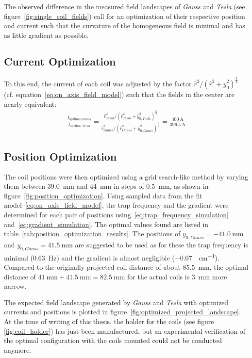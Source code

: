 The observed difference in the measured field landscapes of \textit{Gauss} and \textit{Tesla} (see figure~\ref{fig:single_coil_fields}) call for an optimization of their respective position and current such that the curvature of the homogeneous field is minimal and has as little gradient as possible.

\subsection*{Current Optimization}
To this end, the current of each coil was adjusted by the factor ${\hat r^2}/{(\hat r^2 + \hat y_0^2)^\frac{3}{2}}$ (cf. equation~\ref{eq:on_axis_field_model}) such that the fields in the center are nearly equivalent:
\begin{align}
    \frac{I_{\text{optimal}, \textit{Gauss}}}{I_{\text{optimal}, \textit{Tesla}}} = \frac{\hat r_\textit{Tesla}^2 / (\hat r_\textit{Tesla}^2 + \hat y_{0, \textit{Tesla}}^2)^\frac{3}{2}}{\hat r_\textit{Gauss}^2 / (\hat r_\textit{Gauss}^2 + \hat y_{0, \textit{Gauss}}^2)^\frac{3}{2}} = \frac{\SI{400}{\ampere}}{\SI{396.5}{\ampere}}
\end{align}

\subsection*{Position Optimization}
The coil positions were then optimized using a grid search-like method by varying them between \SI{39.0}{\milli\meter} and \SI{44}{\milli\meter} in steps of \SI{0.5}{\milli\meter}, as shown in figure~\ref{fig:position_optimization}. Using sampled data from the fit model~\eqref{eq:on_axis_field_model}, the trap frequency and the gradient were determined for each pair of positions using~\eqref{eq:trap_frequency_simulation} and~\eqref{eq:gradient_simulation}.
The optimal values found are listed in table~\ref{tab:position_optimization_results}. The positions of $y_{0, \textit{Gauss}} = \SI{-41.0}{\milli\meter}$ and $y_{0, \textit{Gauss}} = \SI{41.5}{\milli\meter}$ are suggested to be used as for these the trap frequency is minimal (\SI{0.63}{\hertz}) and the gradient is almost negligible (\SI{-0.07}{\gauss\per\centi\meter}). Compared to the originally projected coil distance of about \SI{85.5}{\milli\meter}, the optimal distance of $\SI{41}{\milli\meter} + \SI{41.5}{\milli\meter} = \SI{82.5}{\milli\meter}$ for the actual coils is \SI{3}{\milli\meter} more narrow.

The expected field landscape generated by \textit{Gauss} and \textit{Tesla} with optimized currents and positions is plotted in figure~\ref{fig:optimized_projected_landscape}. At the time of writing of this thesis, the holder for the coils (see figure \ref{fig:coil_holder}) has just been manufactured, but an experimental verification of the optimal configuration with the coils mounted could not be conducted anymore.

